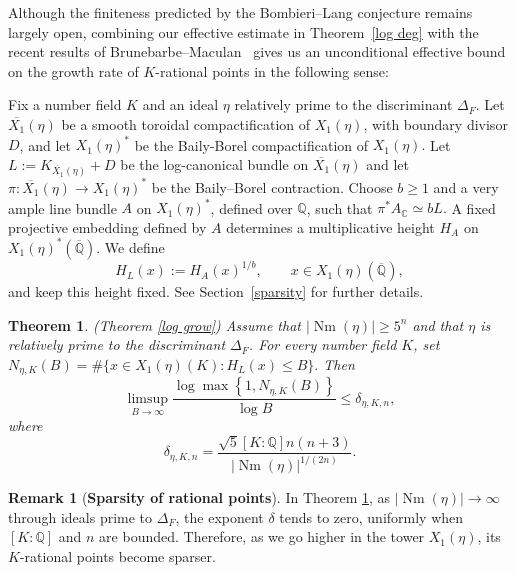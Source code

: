 \documentclass[12 pt]{amsart}
\newtheorem{theorem}{Theorem}[section]
\theoremstyle{definition}
\newtheorem*{Remark*}{Remark}
\newcommand{\Xb}{\overline{X_{1}}}
\newcommand{\Nm}{\operatorname{Nm}}
\begin{document}
Although the finiteness predicted by the Bombieri--Lang conjecture remains largely open, combining our effective estimate in Theorem~\ref{log deg} with the recent results of Brunebarbe--Maculan~\cite{brunebarbe2022counting} gives us an unconditional effective bound on the growth rate of \(K\)-rational points in the following sense:

Fix a number field \(K\) and an ideal \(\eta\) relatively prime to the discriminant \(\Delta_F\). Let \(\Xb(\eta)\) be a smooth toroidal compactification of \(X_1(\eta)\), with boundary divisor \(D\), and let
\(X_1(\eta)^*\) be the Baily-Borel compactification of $X_1(\eta).$
Let \(L:=K_{\Xb(\eta)}+D\) be the log-canonical bundle on  \(\Xb(\eta)\) and
let \(\pi:\Xb(\eta)\longrightarrow X_1(\eta)^*\)
be the Baily--Borel contraction. Choose \(b\geq1\) and a very ample line bundle \(A\) on \(X_1(\eta)^*\), defined over \(\mathbb Q\), such that
\(\pi^*A_{\mathbb C}\simeq bL.\) A fixed projective embedding defined by \(A\) determines a multiplicative height \(H_A\) on \(X_1(\eta)^*(\overline{\mathbb Q})\). We define
\[H_L(x):=H_A(x)^{1/b},
\qquad
x\in X_1(\eta)(\overline{\mathbb Q}),
\]
and keep this height fixed. See Section~\ref{sparsity} for further details.


\begin{theorem}(Theorem \ref{log grow}) \label{main sparsity}
Assume that \(|\Nm(\eta)|\geq5^n\) and that \(\eta\) is relatively prime to the discriminant \(\Delta_F\).
For every number field \(K\), set
\(
N_{\eta,K}(B)
=\#\{x\in X_1(\eta)(K):H_L(x)\leq B\}.
\)
Then
\[
\limsup_{B\to\infty}
\frac{\log\max\left\{1,N_{\eta,K}(B)\right\}}
{\log B}
\leq \delta_{\eta,K,n},
\]
where
\[
\delta_{\eta,K,n}
=\frac{\sqrt5[K:\mathbb Q]n(n+3)}
{|\Nm(\eta)|^{1/(2n)}}.
\]
\end{theorem}


\begin{Remark*}[\textbf{Sparsity of rational points}]
In Theorem \ref{main sparsity}, as \(|\Nm(\eta)|\to\infty\) through ideals prime to \(\Delta_F\), the exponent \(\delta\) tends to zero, uniformly when \([K:\mathbb Q]\) and $n$ are bounded. Therefore, as we go higher in the tower \(X_1(\eta)\), its \(K\)-rational points become sparser.
\end{Remark*}
\end{document}
